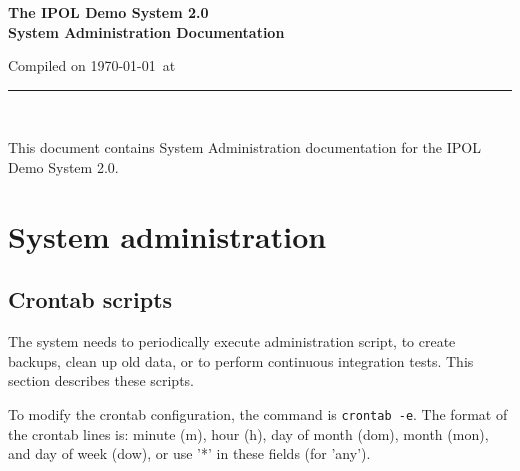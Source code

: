 \documentclass[a4paper,12pt]{article}
\begin{document}
\begin{titlepage}

\begin{center}
\vspace*{-1in}

\vspace*{0.6in}
\begin{Large}
\textbf{The IPOL Demo System 2.0 \\System Administration Documentation} \\
\end{Large}

\vspace*{0.6in}

\small{Compiled on \today\ at \currenttime}

\vspace*{0.6in}
\rule{80mm}{0.1mm}\\
\vspace*{0.1in}
\end{center}

\end{titlepage}

This document contains System Administration documentation for the IPOL Demo System 2.0.
\vspace*{0.6in}


\newpage

\tableofcontents
\newpage
\listoffigures
\newpage



\section{System administration}

\subsection{Crontab scripts}
The system needs to periodically execute administration script, to create backups, clean up old data, or to perform continuous integration tests. This section describes these scripts.

To modify the crontab configuration, the command is {\tt crontab -e}. The format of the crontab lines is: minute (m), hour (h), day of month (dom), month (mon), and day of week (dow), or use '*' in these fields (for 'any').
\end{document}

